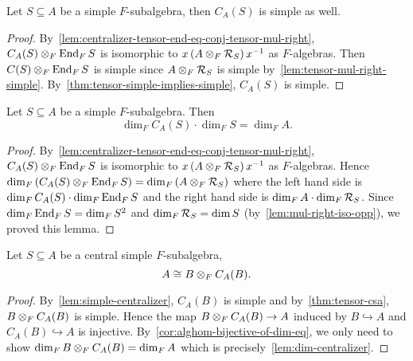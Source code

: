  \begin{lemma}\label{lem:simple-centralizer}
   Let $S\subseteq A$ be a simple $F$-subalgebra, then
   $C_{A}(S)$ is simple as well.
   \leanok
 \end{lemma}

 \begin{proof}
   By~\cref{lem:centralizer-tensor-end-eq-conj-tensor-mul-right},
   $C_{A}(S) \otimes_{F}\operatorname{End}_{F}S$ is isomorphic to
   $x\left(A\otimes_{F}\mathcal{R}_{S}\right)x^{-1}$ as $F$-algebras. Then
   $C(S)\otimes_{F}\operatorname{End}_{F}S$ is simple since $A\otimes_{F}\mathcal{R}_{S}$ is simple
   by~\cref{lem:tensor-mul-right-simple}.
   By~\cref{thm:tensor-simple-implies-simple}, $C_{A}(S)$ is simple.
 \end{proof}

 \begin{lemma}
   \label{lem:dim-centralizer}
   Let $S\subseteq A$ be a simple $F$-subalgebra. Then
   \[
     \dim_{F}C_{A}(S)\cdot\dim_{F}S=\dim_{F}A.
   \]
   \leanok
 \end{lemma}
 \begin{proof}
   By~\cref{lem:centralizer-tensor-end-eq-conj-tensor-mul-right},
   $C_{A}(S) \otimes_{F}\operatorname{End}_{F}S$ is isomorphic to
   $x\left(A\otimes_{F}\mathcal{R}_{S}\right)x^{-1}$ as $F$-algebras. Hence $\dim_{F}\left(C_{A}(S)\otimes_{F}\operatorname{End}_{F}S\right)=\dim_{F}\left(A\otimes_{F}\mathcal{R}_{S}\right)$ where the left hand side is $\dim_{F}C_{A}(S)\cdot \dim_{F}\operatorname{End}_{F}S$ and the right hand side is $\dim_{F}A\cdot\dim_{F}\mathcal{R}_{S}$. Since $\dim_{F}\operatorname{End}_{F}S=\dim_{F}S^{2}$ and $\dim_{F}\mathcal{R}_{S}=\dim S$ (by~\cref{lem:mul-right-iso-opp}), we proved this lemma.
 \end{proof}

\begin{corollary}
  \label{cor:self-tensor-centralizer}
  Let $S \subseteq A$ be a central simple $F$-subalgebra,
  \[
    A \cong B \otimes_{F} C_{A}(B).
  \]
  \leanok
\end{corollary}

\begin{proof}
  By~\cref{lem:simple-centralizer}, $C_{A}(B)$ is simple and by~\cref{thm:tensor-csa}, $B \otimes_{F} C_{A}(B)$ is simple. Hence the map $B \otimes_{F} C_{A}(B) \to A$ induced by $B \hookrightarrow A$ and $C_{A}(B) \hookrightarrow A$ is injective. By~\cref{cor:alghom-bijective-of-dim-eq}, we only need to show $\dim_{F}B\otimes_{F}C_{A}(B) =\dim_{F}A$ which is precisely~\cref{lem:dim-centralizer}.
\end{proof}

